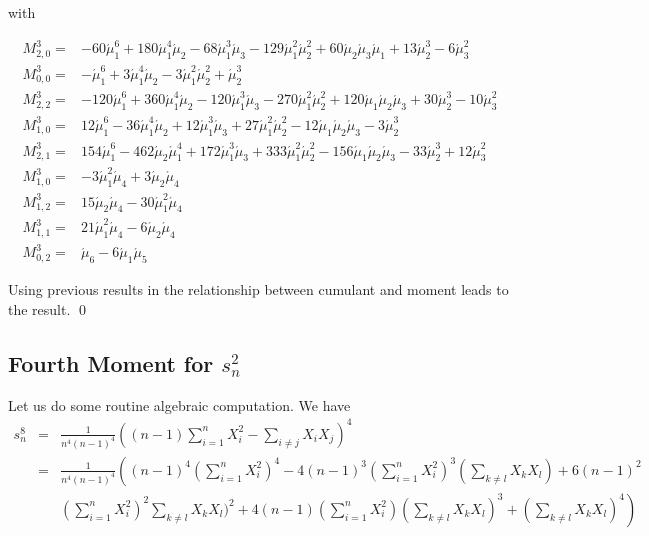 \documentclass{imsart}
\numberwithin{equation}{section}
\theoremstyle{plain}
\theoremstyle{remark}
\begin{document}
with
\begin{footnotesize}
\begin{align} 
M^3_{2,0} = & 
-60 \acute{\mu } _1^6+180 \acute{\mu } _1^4 \acute{\mu } _2 -68 \acute{\mu } _1^3 \acute{\mu } _3 -129 \acute{\mu } _1^2 \acute{\mu } _2^2 +60 \acute{\mu } _2 \acute{\mu } _3 \acute{\mu } _1+13 \acute{\mu } _2^3-6 \acute{\mu } _3^2    \\
%
M^3_{0,0} = & -\acute{\mu }_1^6+3 \acute{\mu}_1^4 \acute{\mu }_2 -3 \acute{\mu }_1^2 \acute{\mu }_2^2 +\acute{\mu }_2^3    \\
%
M^3_{2,2} = & -120 \acute{\mu }_1^6+360 \acute{\mu }_1^4 \acute{\mu }_2 -120
   \acute{\mu }_1^3 \acute{\mu }_3 -270 \acute{\mu }_1^2 \acute{\mu }_2^2 +120 \acute{\mu }_1 \acute{\mu }_2 \acute{\mu }_3 +30 \acute{\mu }_2^3-10
   \acute{\mu }_3^2   \\
%
M^3_{1,0} = &12 \acute{\mu } _1^6-36  \acute{\mu } _1^4 \acute{\mu } _2+12 \acute{\mu } _1^3 \acute{\mu } _3 +27  \acute{\mu } _1^2 \acute{\mu } _2^2 -12 \acute{\mu } _1 \acute{\mu } _2 \acute{\mu } _3 -3 \acute{\mu } _2^3   \\
%
M^3_{2,1} = & 154 \acute{\mu }_1^6-462 \acute{\mu }_2
   \acute{\mu }_1^4+172 \acute{\mu }_1^3 \acute{\mu }_3 +333 \acute{\mu }_1^2 \acute{\mu }_2^2 -156 \acute{\mu }_1 \acute{\mu }_2 \acute{\mu }_3 -33
   \acute{\mu }_2^3+12 \acute{\mu }_3^2 \\
%
M^3_{1,0} = & -3 \acute{\mu }_1^2 \acute{\mu }_4 +3 \acute{\mu }_2 \acute{\mu }_4 \\
%
M^3_{1,2} = & 15 \acute{\mu }_2 \acute{\mu }_4-30 \acute{\mu }_1^2 \acute{\mu }_4 \\
%
M^3_{1,1} = & 21 \acute{\mu }_1^2 \acute{\mu }_4-6 \acute{\mu }_2 \acute{\mu }_4 \\
%
M^3_{0,2} = &  \acute{\mu }_6-6 \acute{\mu }_1 \acute{\mu }_5
\end{align}
\end{footnotesize}


Using previous results in the relationship between cumulant and moment leads to the result. \qed


\subsection{Fourth Moment for $s_n^2$}
Let us do some routine algebraic computation. We have
\begin{eqnarray}
s_n^8 &= & \frac{1}{n^4(n-1)^4} \left( (n-1) \sum_{i=1}^n X_i^2 - \sum_{i \neq j} X_i X_j  \right)^4 \\
& =& \frac{1}{n^4(n-1)^4} \left( (n-1)^4 (\sum_{i=1}^n X_i^2)^4 - 4 (n-1)^3 (\sum_{i=1}^n X_i^2)^3 ( \sum_{k \neq l} X_k X_l ) +  6 (n-1)^2 \right. \nonumber  \\
& & \left. (\sum_{i=1}^n X_i^2)^2   \sum_{k \neq l} X_k X_l )^2 +  4 (n-1) (\sum_{i=1}^n X_i^2) ( \sum_{k \neq l} X_k X_l )^3  + ( \sum_{k \neq l} X_k X_l )^4 \right)
\end{eqnarray}
\end{document}
